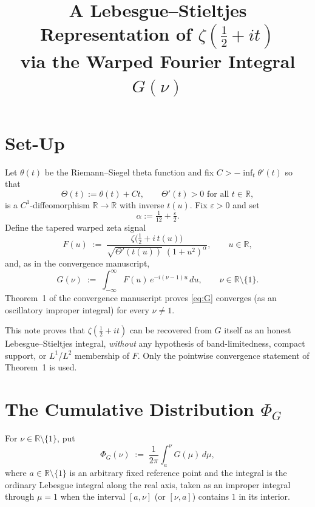 \documentclass[11pt]{article}
\title{A Lebesgue--Stieltjes Representation of $\zeta(\tfrac12+it)$\\
via the Warped Fourier Integral $G(\nu)$}
\author{}
\date{}
\begin{document}
\maketitle

\section{Set-Up}

Let $\theta(t)$ be the Riemann--Siegel theta function and fix $C>-\inf_t\theta'(t)$ so that
\[
\Theta(t) := \theta(t)+Ct,\qquad \Theta'(t)>0\text{ for all }t\in\mathbb R,
\]
is a $C^1$-diffeomorphism $\mathbb R\to\mathbb R$ with inverse $t(u)$. Fix $\varepsilon>0$ and set
\[
\alpha := \tfrac{1}{12}+\tfrac{\varepsilon}{2}.
\]
Define the tapered warped zeta signal
\begin{equation}\label{eq:F}
F(u) \;:=\; \frac{\zeta\!\bigl(\tfrac12+i\,t(u)\bigr)}{\sqrt{\Theta'(t(u))}\;(1+u^2)^\alpha},\qquad u\in\mathbb R,
\end{equation}
and, as in the convergence manuscript,
\begin{equation}\label{eq:G}
G(\nu) \;:=\; \int_{-\infty}^{\infty} F(u)\,e^{-i(\nu-1)u}\,du,\qquad \nu\in\mathbb R\setminus\{1\}.
\end{equation}
Theorem~1 of the convergence manuscript proves \eqref{eq:G} converges (as an oscillatory improper integral) for every $\nu\ne 1$.

This note proves that $\zeta(\tfrac12+it)$ can be recovered from $G$ itself as an honest Lebesgue--Stieltjes integral, \emph{without} any hypothesis of band-limitedness, compact support, or $L^1$/$L^2$ membership of $F$. Only the pointwise convergence statement of Theorem~1 is used.

\section{The Cumulative Distribution $\Phi_G$}

\begin{definition}\label{def:Phi}
For $\nu\in\mathbb R\setminus\{1\}$, put
\begin{equation}\label{eq:PhiG}
\Phi_G(\nu) \;:=\; \frac{1}{2\pi}\int_{a}^{\nu} G(\mu)\,d\mu,
\end{equation}
where $a\in\mathbb R\setminus\{1\}$ is an arbitrary fixed reference point and the integral is the ordinary Lebesgue integral along the real axis, taken as an improper integral through $\mu=1$ when the interval $[a,\nu]$ (or $[\nu,a]$) contains $1$ in its interior.
\end{definition}
\end{document}
